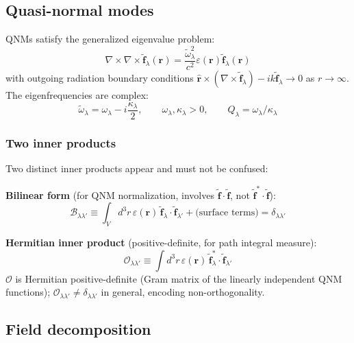\documentclass[12pt]{article}
\newcommand{\tf}{\tilde{\mathbf{f}}}
\newcommand{\tomega}{\tilde{\omega}}
\begin{document}
\subsection{Quasi-normal modes}

QNMs satisfy the generalized eigenvalue problem:
\begin{equation}
  \nabla\times\nabla\times\tf_\lambda(\mathbf{r})
  =\frac{\tomega_\lambda^2}{c^2}\varepsilon(\mathbf{r})\tf_\lambda(\mathbf{r})
  \label{eq:QNM_eigen}
\end{equation}
with outgoing radiation boundary conditions
$\hat{\mathbf{r}}\times(\nabla\times\tf_\lambda)-ik\tf_\lambda\to 0$
as $r\to\infty$.  The eigenfrequencies are complex:
\begin{equation}
  \tomega_\lambda = \omega_\lambda - i\frac{\kappa_\lambda}{2},\qquad
  \omega_\lambda,\kappa_\lambda>0,\qquad Q_\lambda=\omega_\lambda/\kappa_\lambda
  \label{eq:complex_freq}
\end{equation}

\subsubsection*{Two inner products}
Two distinct inner products appear and must not be confused:

\textbf{Bilinear form} (for QNM normalization, involves $\tf\cdot\tf$, not
$\tf^*\cdot\tf$):
\begin{equation}
  \mathcal{B}_{\lambda\lambda'} \equiv
  \int_V d^3r\,\varepsilon(\mathbf{r})\,\tf_\lambda\cdot\tf_{\lambda'}
  +\text{(surface terms)}=\delta_{\lambda\lambda'}
  \label{eq:bilinear_norm}
\end{equation}

\textbf{Hermitian inner product} (positive-definite, for path integral
measure):
\begin{equation}
  \mathcal{O}_{\lambda\lambda'} \equiv
  \int d^3r\,\varepsilon(\mathbf{r})\,\tf_\lambda^*\cdot\tf_{\lambda'}
  \label{eq:hermitian_overlap}
\end{equation}
$\mathcal{O}$ is Hermitian positive-definite (Gram matrix of the linearly
independent QNM functions); $\mathcal{O}_{\lambda\lambda'}\neq\delta_{\lambda\lambda'}$
in general, encoding non-orthogonality.

\subsection{Field decomposition}
\end{document}
